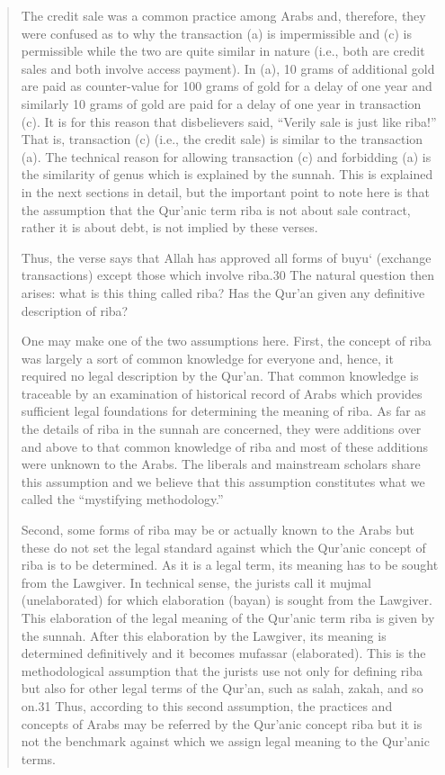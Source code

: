 \begin{quote}
The credit sale was a common practice among Arabs and, therefore, they were confused as to why the transaction (a) is impermissible and (c) is permissible while the two are quite similar in nature (i.e., both are credit sales and both involve access payment). In (a), 10 grams of additional gold are paid as counter-value for 100 grams of gold for a delay of one year and similarly 10 grams of gold are paid for a delay of one year in transaction (c). It is for this reason that disbelievers said, “Verily sale is just like riba!” That is, transaction (c) (i.e., the credit sale) is similar to the transaction (a). The technical reason for allowing transaction (c) and forbidding (a) is the similarity of genus which is explained by the sunnah. This is explained in the next sections in detail, but the important point to note here is that the assumption that the Qur'anic term riba is not about sale contract, rather it is about debt, is not implied by these verses.

Thus, the verse says that Allah has approved all forms of buyu‘ (exchange transactions) except those which involve riba.30 The natural question then arises: what is this thing called riba? Has the Qur'an given any definitive description of riba?

One may make one of the two assumptions here. First, the concept of riba was largely a sort of common knowledge for everyone and, hence, it required no legal description by the Qur'an. That common knowledge is traceable by an examination of historical record of Arabs which provides sufficient legal foundations for determining the meaning of riba. As far as the details of riba in the sunnah are concerned, they were additions over and above to that common knowledge of riba and most of these additions were unknown to the Arabs. The liberals and mainstream scholars share this assumption and we believe that this assumption constitutes what we called the “mystifying methodology.”

Second, some forms of riba may be or actually known to the Arabs but these do not set the legal standard against which the Qur'anic concept of riba is to be determined. As it is a legal term, its meaning has to be sought from the Lawgiver. In technical sense, the jurists call it mujmal (unelaborated) for which elaboration (bayan) is sought from the Lawgiver. This elaboration of the legal meaning of the Qur'anic term riba is given by the sunnah. After this elaboration by the Lawgiver, its meaning is determined definitively and it becomes mufassar (elaborated). This is the methodological assumption that the jurists use not only for defining riba but also for other legal terms of the Qur'an, such as salah, zakah, and so on.31 Thus, according to this second assumption, the practices and concepts of Arabs may be referred by the Qur'anic concept riba but it is not the benchmark against which we assign legal meaning to the Qur'anic terms.


\end{quote}
